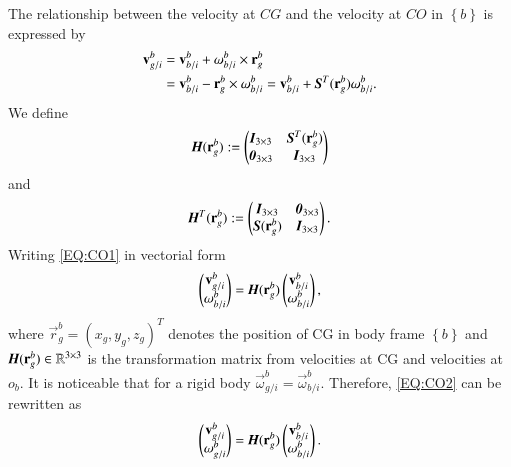 The relationship between the velocity at $CG$ and the velocity at $CO$ in $\left\{ b \right\}$ is expressed by 
\begin{align}
\vec{v}_{g/i}^{b}&=\vec{v}^{b}_{b/i}+\vec{\omega}^{b}_{b/i}\times \vec{r}^{b}_{g}
\nonumber \\
&=\vec{v}^{b}_{b/i}-\vec{r}^{b}_{g}\times \vec{\omega}^{b}_{b/i}
=\vec{v}^{b}_{b/i}+\emph{\textbf{S}}^{T}(\vec{r}^{b}_{g})\vec{\omega}^{b}_{b/i}.\label{EQ:CO1}
\end{align}
We define
\begin{align}
\emph{\textbf{H}}(\vec{r}^{b}_{g}):=
\begin{pmatrix}
\emph{\textbf{I}}_{3\times 3}&\emph{\textbf{S}}^{T}(\vec{r}^{b}_{g})\\
\emph{\textbf{0}}_{3\times 3}&\emph{\textbf{I}}_{3\times 3}
\end{pmatrix}
\end{align}
and
\begin{align}
\emph{\textbf{H}}^{T}(\vec{r}^{b}_{g}):=
\begin{pmatrix}
\emph{\textbf{I}}_{3\times 3}&\emph{\textbf{0}}_{3\times 3} \\
\emph{\textbf{S}}(\vec{r}^{b}_{g})
&\emph{\textbf{I}}_{3\times 3}
\end{pmatrix}.
\end{align}
Writing \ref{EQ:CO1} in vectorial form
\begin{align}
\begin{pmatrix}
\vec{v}^{b}_{g/i} \\
\vec{\omega}^{b}_{b/i}
\end{pmatrix}
=\emph{\textbf{H}}(\vec{r}^{b}_{g})
\begin{pmatrix}
\vec{v}^{b}_{b/i} \\
\vec{\omega}^{b}_{b/i}
\end{pmatrix}\label{EQ:CO2},
\end{align}
where $\vec{r}^{b}_{g}=(x_{g}, y_{g}, z_{g})^{T}$
denotes the position of CG in body frame $\left\{ b \right\}$ and $\emph{\textbf{H}}(\vec{r}^{b}_{g})\in \mathbb{R}^{3\times 3}$ is the transformation matrix from velocities at CG and velocities at $o_{b}$. It is noticeable that for a rigid body $\vec{\omega}^{b}_{g/i}=\vec{\omega}^{b}_{b/i}$. Therefore, \ref{EQ:CO2} can be rewritten as
\begin{align}
\begin{pmatrix}
\vec{v}^{b}_{g/i} \\
\vec{\omega}^{b}_{g/i}
\end{pmatrix}
=\emph{\textbf{H}}(\vec{r}^{b}_{g})
\begin{pmatrix}
\vec{v}^{b}_{b/i} \\
\vec{\omega}^{b}_{b/i}
\end{pmatrix}\label{EQ:CO3}.
\end{align}

